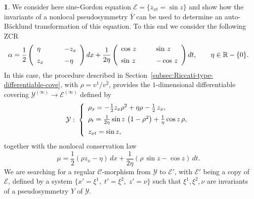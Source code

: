 \documentclass[12pt,english]{elsarticle}
\theoremstyle{plain}
\theoremstyle{plain}
\theoremstyle{remark}
\theoremstyle{plain}
\theoremstyle{definition}
\theoremstyle{definition}
\newtheorem{example}[thm]{\protect\examplename}
\providecommand{\examplename}{Example}
\begin{document}
\begin{example}
\label{exmp29}
We consider here sine-Gordon equation
$\mathcal{E}=\{z_{xt}=\sin z\}$ and show how the invariants of a nonlocal
pseudosymmetry $\bar{Y}$ can be used to determine an auto-B\"{a}cklund
transformation of this equation. To this end we consider the following
ZCR
%
\begin{equation*}
\alpha =\frac{1}{2}\left (
%
\begin{array}{l@{\quad}l}
\eta \  & -z_{x}
\vspace{5pt}
\\
z_{x}\qquad & -{\displaystyle \eta}
\end{array}
%
\right )dx+\frac{1}{2\eta}\left (
%
\begin{array}{l@{\quad}l}
\cos \,z
\vspace{5pt}
& \sin \,z
\\
\sin \,z\qquad & -\cos \,z
\end{array}
%
\right )dt,\qquad \eta \in \mathbb{R}-\{0\}.
\end{equation*}
%
In this case, the procedure described in Section~\ref{subsec:Riccati-type-differentiable-cove}, with
$\rho =v^{1}/v^{2}$, provides the $1$-dimensional differentiable covering
$\mathcal{Y}^{(\infty )}\rightarrow \mathcal{E}^{(\infty )}$ defined by
%
\begin{equation*}
\mathcal{Y}:\;\left \{
%
\begin{array}{l}
\rho _{x}=-\frac{1}{2}z_{x}\rho ^{2}+\eta \rho -\frac{1}{2}\,z_{x},
\vspace{5pt}
\\
\rho _{t}=\frac{1}{2\eta}\sin z\,\left (1-\rho ^{2}\right )+
\frac{1}{\eta}\cos z\,\rho ,
\vspace{5pt}
\\
z_{xt}=\sin z,
\end{array}
%
\right .
\end{equation*}
%
together with the nonlocal conservation law
%
\begin{equation*}
\mu =\frac{1}{2}\left (\rho z_{x}-\eta \right )\,dx+\frac{1}{2\eta}
\left (\rho \,\sin z-\cos z\right )\,dt.
\end{equation*}
%
We are searching for a regular $\mathcal{C}$-morphism from
$\mathcal{Y}$ to $\mathcal{E}'$, with $\mathcal{E}'$ being a copy of
$\mathcal{E}$, defined by a system
$\{x'=\xi ^{1},\;t'=\xi ^{2},\;z'=\nu \}$ such that
$\xi ^{1},\xi ^{2},\nu $ are invariants of a pseudosymmetry $Y$ of
$\mathcal{Y}$.


\end{example}
\end{document}
